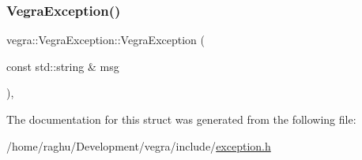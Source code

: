 \subsubsection{\texorpdfstring{Vegra\+Exception()}{VegraException()}}
{\footnotesize\ttfamily vegra\+::\+Vegra\+Exception\+::\+Vegra\+Exception (\begin{DoxyParamCaption}\item[{const std\+::string \&}]{msg }\end{DoxyParamCaption})\hspace{0.3cm}{\ttfamily [inline]}, {\ttfamily [explicit]}}



The documentation for this struct was generated from the following file\+:\begin{DoxyCompactItemize}
\item 
/home/raghu/\+Development/vegra/include/\mbox{\hyperlink{exception_8h}{exception.\+h}}\end{DoxyCompactItemize}
